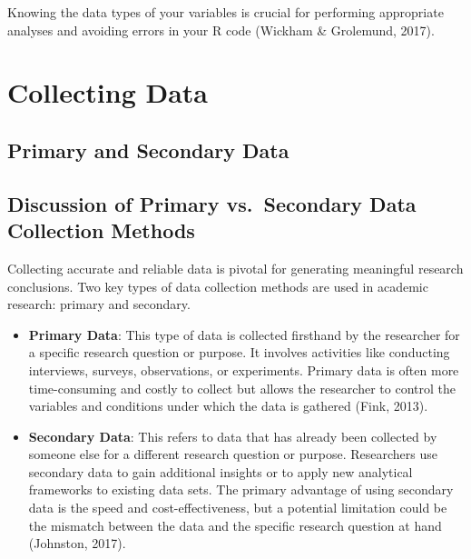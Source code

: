 \documentclass[
]{book}
\begin{document}
Knowing the data types of your variables is crucial for performing appropriate analyses and avoiding errors in your R code (Wickham \& Grolemund, 2017).

\hypertarget{collecting-data}{%
\section{Collecting Data}\label{collecting-data}}

\hypertarget{primary-and-secondary-data}{%
\subsection*{Primary and Secondary Data}\label{primary-and-secondary-data}}

\hypertarget{discussion-of-primary-vs.-secondary-data-collection-methods}{%
\subsection*{Discussion of Primary vs.~Secondary Data Collection Methods}\label{discussion-of-primary-vs.-secondary-data-collection-methods}}

Collecting accurate and reliable data is pivotal for generating meaningful research conclusions. Two key types of data collection methods are used in academic research: primary and secondary.

\begin{itemize}
\item
  \textbf{Primary Data}: This type of data is collected firsthand by the researcher for a specific research question or purpose. It involves activities like conducting interviews, surveys, observations, or experiments. Primary data is often more time-consuming and costly to collect but allows the researcher to control the variables and conditions under which the data is gathered (Fink, 2013).
\item
  \textbf{Secondary Data}: This refers to data that has already been collected by someone else for a different research question or purpose. Researchers use secondary data to gain additional insights or to apply new analytical frameworks to existing data sets. The primary advantage of using secondary data is the speed and cost-effectiveness, but a potential limitation could be the mismatch between the data and the specific research question at hand (Johnston, 2017).
\end{itemize}
\end{document}

